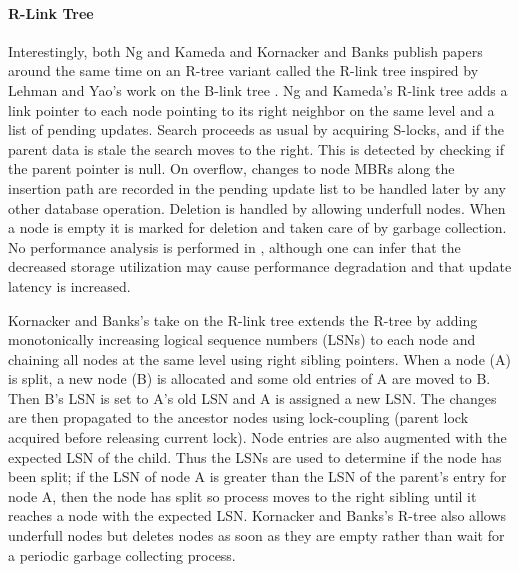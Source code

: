 \paragraph{R-Link Tree} Interestingly, both Ng and Kameda\cite{ng1994r} and 
Kornacker and Banks\cite{kornacker1995high} publish papers around the same time on 
an R-tree variant called the R-link tree inspired by Lehman and Yao's work on the 
B-link tree \cite{lehman1981efficient}. Ng and Kameda's R-link tree\cite{ng1994r} 
adds a link pointer to each node pointing to its right neighbor on the same level and
a list of pending updates. Search proceeds as usual by acquiring S-locks, and 
if the parent data is stale the search moves to the right. This is detected by
checking if the parent pointer is null. On overflow, changes to node MBRs along 
the insertion path are recorded in the pending update list to be handled later 
by any other database operation. Deletion is handled by allowing underfull nodes.
When a node is empty it is marked for deletion and taken care of by garbage
collection. No performance analysis is performed in \cite{ng1994r}, although one
can infer that the decreased storage utilization may cause performance degradation
and that update latency is increased.

Kornacker and Banks's take on the R-link tree\cite{kornacker1995high} extends 
the R-tree by adding monotonically increasing logical sequence numbers (LSNs) 
to each node and chaining all nodes at the same level using right sibling 
pointers. When a node (A) is split, a new node (B) is allocated and some old 
entries of A are moved to B. Then B's LSN is set to A's old LSN and A is assigned 
a new LSN. The changes are then propagated to the ancestor nodes using lock-coupling
(parent lock acquired before releasing current lock). Node entries are also 
augmented with the expected LSN of the child. Thus the LSNs are used 
to determine if the node has been split; if the LSN of node A is greater than 
the LSN of the parent's entry for node A, then the node has split so process 
moves to the right sibling until it reaches a node with the expected LSN. 
Kornacker and Banks's R-tree also allows underfull nodes but deletes nodes as 
soon as they are empty rather than wait for a periodic garbage collecting process.

	
